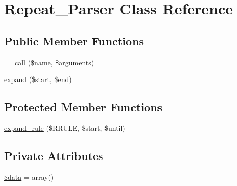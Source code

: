 \hypertarget{classRepeat__Parser}{
\section{Repeat\_\-Parser Class Reference}
\label{classRepeat__Parser}
}
\subsection*{Public Member Functions}
\begin{DoxyCompactItemize}
\item 
\hyperlink{classRepeat__Parser_a3815af62ed9d37b2dcaa175379bbfeca}{\_\-\_\-call} (\$name, \$arguments)
\item 
\hyperlink{classRepeat__Parser_a1bf43fc9d8d04fc2e5fa846269f30e70}{expand} (\$start, \$end)
\end{DoxyCompactItemize}
\subsection*{Protected Member Functions}
\begin{DoxyCompactItemize}
\item 
\hyperlink{classRepeat__Parser_aee0716ed16629ab6df05dd9c28044514}{expand\_\-rule} (\$RRULE, \$start, \$until)
\end{DoxyCompactItemize}
\subsection*{Private Attributes}
\begin{DoxyCompactItemize}
\item 
\hyperlink{classRepeat__Parser_a6efc15b5a2314dd4b5aaa556a375c6d6}{\$data} = array()
\end{DoxyCompactItemize}


